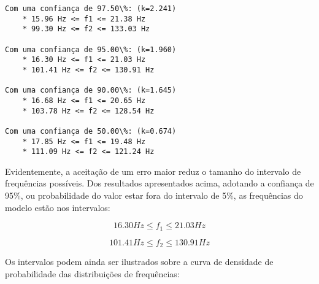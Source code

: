     \begin{Verbatim}[commandchars=\\\{\}]
Com uma confiança de 97.50\%: (k=2.241)
    * 15.96 Hz <= f1 <= 21.38 Hz
    * 99.30 Hz <= f2 <= 133.03 Hz

Com uma confiança de 95.00\%: (k=1.960)
    * 16.30 Hz <= f1 <= 21.03 Hz
    * 101.41 Hz <= f2 <= 130.91 Hz

Com uma confiança de 90.00\%: (k=1.645)
    * 16.68 Hz <= f1 <= 20.65 Hz
    * 103.78 Hz <= f2 <= 128.54 Hz

Com uma confiança de 50.00\%: (k=0.674)
    * 17.85 Hz <= f1 <= 19.48 Hz
    * 111.09 Hz <= f2 <= 121.24 Hz

    \end{Verbatim}

    Evidentemente, a aceitação de um erro maior reduz o tamanho do intervalo
de frequências possíveis. Dos resultados apresentados acima, adotando a
confiança de 95\%, ou probabilidade do valor estar fora do intervalo de
5\%, as frequências do modelo estão nos intervalos:

\[ 16.30 Hz \le f_1 \le 21.03 Hz \]

\[ 101.41 Hz \le f_2 \le 130.91 Hz \]

Os intervalos podem ainda ser ilustrados sobre a curva de densidade de
probabilidade das distribuições de frequências:

